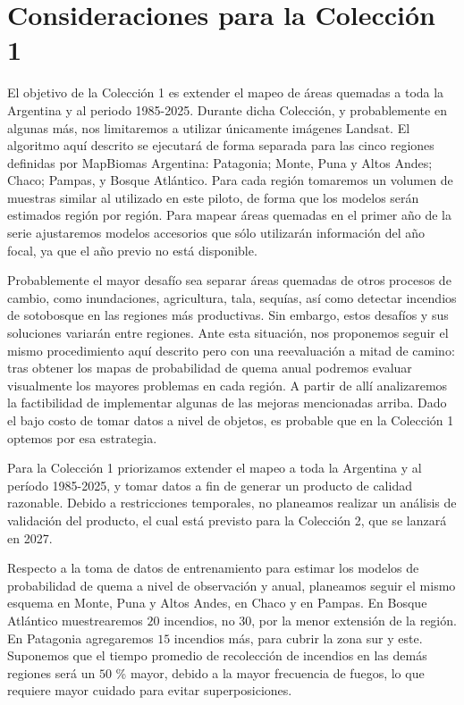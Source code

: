 \documentclass[11pt,a4paper]{article}
\begin{document}
\section{Consideraciones para la Colección 1}

El objetivo de la Colección 1 es extender el mapeo de áreas quemadas a toda la Argentina y al periodo 1985-2025. Durante dicha Colección, y probablemente en algunas más, nos limitaremos a utilizar únicamente imágenes Landsat. El algoritmo aquí descrito se ejecutará de forma separada para las cinco regiones definidas por MapBiomas Argentina: Patagonia; Monte, Puna y Altos Andes; Chaco; Pampas, y Bosque Atlántico. Para cada región tomaremos un volumen de muestras similar al utilizado en este piloto, de forma que los modelos serán estimados región por región. Para mapear áreas quemadas en el primer año de la serie ajustaremos modelos accesorios que sólo utilizarán información del año focal, ya que el año previo no está disponible.  

Probablemente el mayor desafío sea separar áreas quemadas de otros procesos de cambio, como inundaciones, agricultura, tala, sequías, así como detectar incendios de sotobosque en las regiones más productivas. Sin embargo, estos desafíos y sus soluciones variarán entre regiones. Ante esta situación, nos proponemos seguir el mismo procedimiento aquí descrito pero con una reevaluación a mitad de camino: tras obtener los mapas de probabilidad de quema anual podremos evaluar visualmente los mayores problemas en cada región. A partir de allí analizaremos la factibilidad de implementar algunas de las mejoras mencionadas arriba. Dado el bajo costo de tomar datos a nivel de objetos, es probable que en la Colección 1 optemos por esa estrategia.

Para la Colección 1 priorizamos extender el mapeo a toda la Argentina y al período 1985-2025, y tomar datos a fin de generar un producto de calidad razonable. Debido a restricciones temporales, no planeamos realizar un análisis de validación del producto, el cual está previsto para la Colección 2, que se lanzará en 2027.

Respecto a la toma de datos de entrenamiento para estimar los modelos de probabilidad de quema a nivel de observación y anual, planeamos seguir el mismo esquema en Monte, Puna y Altos Andes, en Chaco y en Pampas. En Bosque Atlántico muestrearemos $20$ incendios, no $30$, por la menor extensión de la región. En Patagonia agregaremos $15$ incendios más, para cubrir la zona sur y este. Suponemos que el tiempo promedio de recolección de incendios en las demás regiones será un $50$ \% mayor, debido a la mayor frecuencia de fuegos, lo que requiere mayor cuidado para evitar superposiciones.
\end{document}
